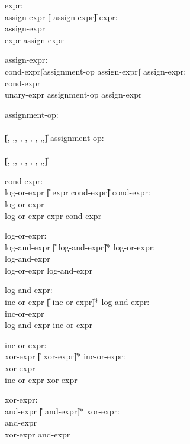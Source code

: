 \begin{center}
\PAIR
{
expr:\\
\>	assign-expr \U{[}\T{,} assign-expr\U{]}
}
{
expr:\\
\>	assign-expr\\
\>	expr \T{,} assign-expr
}

\PAIR
{
assign-expr:\\
\>	cond-expr\U{[}assignment-op assign-expr\U{]}
}
{
assign-expr:\\
\>	cond-expr\\
\>	unary-expr assignment-op assign-expr
}



\PAIR
{
assignment-op: \\
\>       \T{=}\\
\>     	\U{[}\T{*}, \T{/},\T{\%}, \T{+}, \T{-}, \T{\rightshift}, \T{\leftshift}, \T{\&},\T{\circumflex},\T{|}\U{]}  \T{=}
}
{
assignment-op: \\
\>       \T{=}\\
\>     	\U{[}\T{*}, \T{/},\T{\%}, \T{+}, \T{-}, \T{\rightshift}, \T{\leftshift}, \T{\&},\T{\circumflex},\T{|}\U{]}  \T{=}
}

\PAIR
{
cond-expr:\\
\>	log-or-expr \U{[} expr \T{:} cond-expr\U{]}
}
{
cond-expr:\\
\>	log-or-expr\\
\>	log-or-expr  expr \T{:} cond-expr
}

\PAIR
{
log-or-expr:\\
\>	log-and-expr \U{[}\T{||} log-and-expr\U{]}*
}
{
log-or-expr:\\
\>	log-and-expr\\
\>	log-or-expr \T{||} log-and-expr
}



\PAIR
{
log-and-expr:\\
\>	inc-or-expr \U{[}\T{\&\&} inc-or-expr\U{]}*
}
{
log-and-expr:\\
\>	inc-or-expr\\
\>	log-and-expr \T{\&\&} inc-or-expr
}

\PAIR
{
inc-or-expr:\\
\>	xor-expr \U{[}\T{|} xor-expr\U{]}*
}
{
inc-or-expr:\\
\>	xor-expr\\
\>	inc-or-expr \T{|} xor-expr
}


\PAIR
{
xor-expr:\\
\>	and-expr \U{[}\T{\circumflex} and-expr\U{]}*
}
{
xor-expr:\\
\>	and-expr\\
\>	xor-expr \T{\circumflex} and-expr
}




\end{center}
